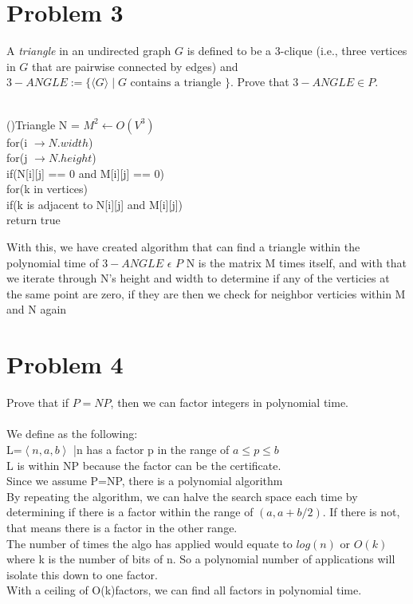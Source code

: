 \documentclass[12pt]{article}
\begin{document}
\section*{Problem 3}
A \emph{triangle} in an undirected graph $G $ is defined to be a 3-clique (i.e., three vertices in $G$ that are pairwise connected by edges)
and $3-ANGLE := \{ \langle G \rangle \mid G \mbox{ contains a triangle }\}$. Prove that $3-ANGLE \in P$. 
\\\\
\begin{algorithm}[H]
    \Fn(){Triangle}{
    \SetAlgoLined
    \SetNoFillComment
    \DontPrintSemicolon
    N = $M^2 \leftarrow O(V^3)$\\
    for(i $\rightarrow N.width$){\\
        \hspace{0.5cm}for(j $\rightarrow N.height$){\\
        \hspace{1cm}if(N[i][j] == 0 and M[i][j] == 0){\\
            \hspace{1.5cm}for(k in vertices){\\
                \hspace{2cm}if(k is adjacent to N[i][j] and M[i][j]){\\
                \hspace{2.5cm}return true}
            }
        }
        }    
    }
    }
    \end{algorithm}
    With this, we have created algorithm that can find a triangle within the polynomial time of $3 - ANGLE$  $\epsilon$  $P$
    N is the matrix M times itself, and with that we iterate through N's height and width to determine if any of the verticies at the same point are zero, if they are then we check for neighbor verticies within M and N again
\bigskip
\section*{Problem 4}
Prove that if $P = NP$, then we can factor integers in polynomial time.
\\\\
We define as the following: \\L={$\left\langle n,a,b\right\rangle$ |n has a factor p in the range of $a \leq p \leq b$}\\L is within NP because the factor can be the certificate.\\Since we assume P=NP, there is a polynomial algorithm\\By repeating the algorithm, we can halve the search space each time by determining if there is a factor within the range of $(a, a+b/2)$. If there is not, that means there is a factor in the other range. \\The number of times the algo has applied would equate to $log(n)$ or $O(k)$ where k is the number of bits of n. So a polynomial number of applications will isolate this down to one factor.\\With a ceiling of O(k)factors, we can find all factors in polynomial time.
\end{document}
